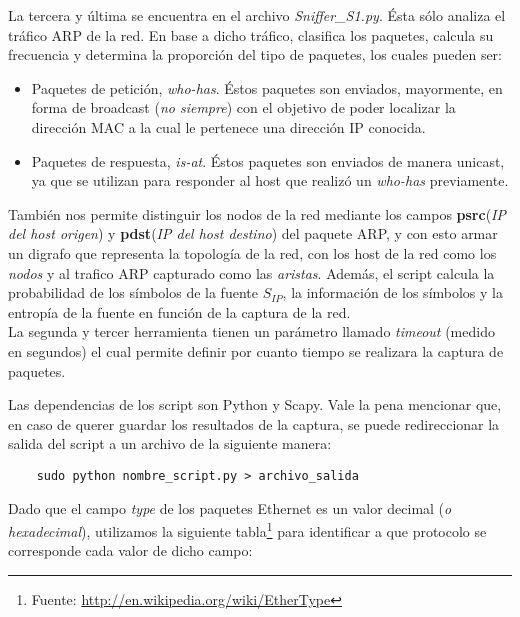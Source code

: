 La tercera y última se encuentra en el archivo \textit{Sniffer\_S1.py}. Ésta sólo analiza el tráfico ARP de la red. En base a dicho tráfico, clasifica los paquetes, calcula su frecuencia y determina la proporción del tipo de paquetes, los cuales pueden ser:
\begin{itemize}
    \item Paquetes de petición, \textit{who-has}. Éstos paquetes son enviados, mayormente, en forma de broadcast (\textit{no siempre}) con el objetivo de poder localizar la dirección MAC a la cual le pertenece una dirección IP conocida.
    \item Paquetes de respuesta, \textit{is-at}. Éstos paquetes son enviados de manera unicast, ya que se utilizan para responder al host que realizó un \textit{who-has} previamente.
\end{itemize}
También nos permite distinguir los nodos de la red mediante los campos 
\textbf{psrc}(\textit{IP del host origen}) y \textbf{pdst}(\textit{IP del host destino}) del paquete ARP, y con esto armar un digrafo que representa la topología de la red, con los 
host de la red como los \textit{nodos} y al trafico ARP capturado como las \textit{aristas}. 
Además, el script calcula la probabilidad de los símbolos de la fuente $S_{IP}$, la información 
de los símbolos y la entropía de la fuente en función de la captura de la red.\\

La segunda y tercer herramienta tienen un parámetro llamado \textit{timeout} (medido en segundos) el cual permite definir por cuanto tiempo se realizara la captura de paquetes.

Las dependencias de los script son Python y Scapy. Vale la pena mencionar que, en caso de querer guardar los resultados de la captura, se puede redireccionar la salida del script a un archivo de la siguiente manera:
\begin{verbatim}
    sudo python nombre_script.py > archivo_salida
\end{verbatim}

Dado que el campo \textit{type} de los paquetes Ethernet es un valor decimal (\textit{o hexadecimal}), utilizamos la siguiente tabla\footnote{Fuente: \url{http://en.wikipedia.org/wiki/EtherType}} para identificar a que protocolo se corresponde cada valor de dicho campo:

